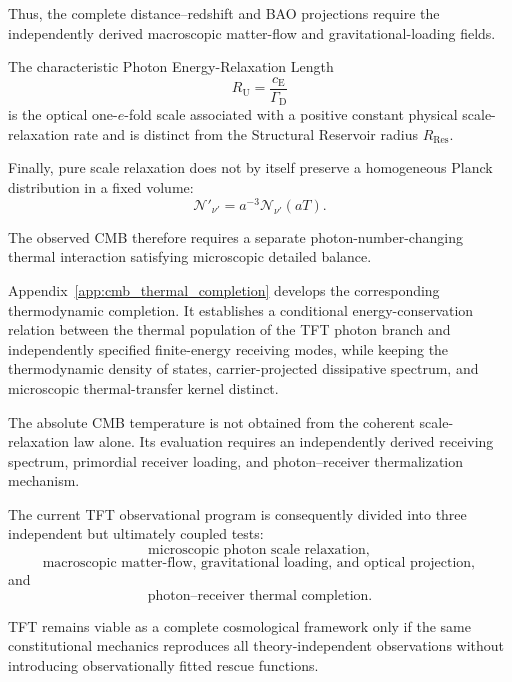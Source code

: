 Thus, the complete distance--redshift and BAO projections require the
independently derived macroscopic matter-flow and gravitational-loading fields.

The characteristic Photon Energy-Relaxation Length
\begin{equation}
    R_{\mathrm U}
    =
    \frac{
        c_{\mathrm E}
    }{
        \Gamma_{\mathrm D}
    }
\end{equation}
is the optical one-\(e\)-fold scale associated with a positive constant
physical scale-relaxation rate and is distinct from the Structural Reservoir
radius \(R_{\mathrm{Res}}\).

Finally, pure scale relaxation does not by itself preserve a homogeneous
Planck distribution in a fixed volume:
\begin{equation}
    \mathcal N'_{\nu'}
    =
    a^{-3}
    \mathcal N_{\nu'}(aT).
\end{equation}

The observed CMB therefore requires a separate photon-number-changing thermal
interaction satisfying microscopic detailed balance.

Appendix~\ref{app:cmb_thermal_completion}
develops the corresponding thermodynamic completion. It establishes a
conditional energy-conservation relation between the thermal population of
the TFT photon branch and independently specified finite-energy receiving
modes, while keeping the thermodynamic density of states,
carrier-projected dissipative spectrum, and microscopic thermal-transfer
kernel distinct.

The absolute CMB temperature is not obtained from the coherent
scale-relaxation law alone. Its evaluation requires an independently derived
receiving spectrum, primordial receiver loading, and photon--receiver
thermalization mechanism.

The current TFT observational program is consequently divided into three
independent but ultimately coupled tests:
\begin{equation}
    \text{microscopic photon scale relaxation},
\end{equation}
\begin{equation}
    \text{macroscopic matter-flow, gravitational loading, and optical
    projection},
\end{equation}
and
\begin{equation}
    \text{photon--receiver thermal completion}.
\end{equation}

TFT remains viable as a complete cosmological framework only if the same
constitutional mechanics reproduces all theory-independent observations
without introducing observationally fitted rescue functions.